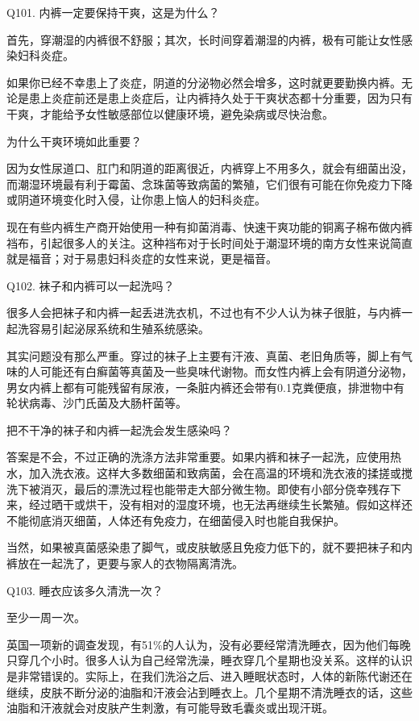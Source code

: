 \documentclass[12pt,UTF8]{ctexbook}
\begin{document}
Q101. 内裤一定要保持干爽，这是为什么？


首先，穿潮湿的内裤很不舒服；其次，长时间穿着潮湿的内裤，极有可能让女性感染妇科炎症。


如果你已经不幸患上了炎症，阴道的分泌物必然会增多，这时就更要勤换内裤。无论是患上炎症前还是患上炎症后，让内裤持久处于干爽状态都十分重要，因为只有干爽，才能给予女性敏感部位以健康环境，避免染病或尽快治愈。


为什么干爽环境如此重要？

因为女性尿道口、肛门和阴道的距离很近，内裤穿上不用多久，就会有细菌出没，而潮湿环境最有利于霉菌、念珠菌等致病菌的繁殖，它们很有可能在你免疫力下降或阴道环境变化时入侵，让你患上恼人的妇科炎症。

现在有些内裤生产商开始使用一种有抑菌消毒、快速干爽功能的铜离子棉布做内裤裆布，引起很多人的关注。这种裆布对于长时间处于潮湿环境的南方女性来说简直就是福音；对于易患妇科炎症的女性来说，更是福音。





Q102. 袜子和内裤可以一起洗吗？


很多人会把袜子和内裤一起丢进洗衣机，不过也有不少人认为袜子很脏，与内裤一起洗容易引起泌尿系统和生殖系统感染。

其实问题没有那么严重。穿过的袜子上主要有汗液、真菌、老旧角质等，脚上有气味的人可能还有白癣菌等真菌及一些臭味代谢物。而女性内裤上会有阴道分泌物，男女内裤上都有可能残留有尿液，一条脏内裤还会带有0.1克粪便痕，排泄物中有轮状病毒、沙门氏菌及大肠杆菌等。

把不干净的袜子和内裤一起洗会发生感染吗？

答案是不会，不过正确的洗涤方法非常重要。如果内裤和袜子一起洗，应使用热水，加入洗衣液。这样大多数细菌和致病菌，会在高温的环境和洗衣液的揉搓或搅洗下被消灭，最后的漂洗过程也能带走大部分微生物。即使有小部分侥幸残存下来，经过晒干或烘干，没有相对的湿度环境，也无法再继续生长繁殖。假如这样还不能彻底消灭细菌，人体还有免疫力，在细菌侵入时也能自我保护。

当然，如果被真菌感染患了脚气，或皮肤敏感且免疫力低下的，就不要把袜子和内裤放在一起洗了，更要与家人的衣物隔离清洗。





Q103. 睡衣应该多久清洗一次？


至少一周一次。

英国一项新的调查发现，有51\%的人认为，没有必要经常清洗睡衣，因为他们每晚只穿几个小时。很多人认为自己经常洗澡，睡衣穿几个星期也没关系。这样的认识是非常错误的。实际上，在我们洗浴之后、进入睡眠状态时，人体的新陈代谢还在继续，皮肤不断分泌的油脂和汗液会沾到睡衣上。几个星期不清洗睡衣的话，这些油脂和汗液就会对皮肤产生刺激，有可能导致毛囊炎或出现汗斑。
\end{document}
